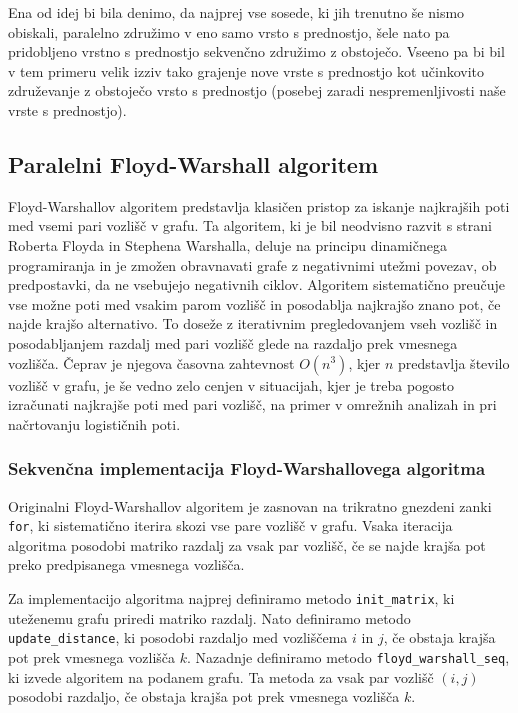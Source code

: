\documentclass[fin1, tisk]{fmfdelo}
\begin{document}
Ena od idej bi bila denimo, da najprej vse sosede, ki jih trenutno še nismo obiskali, paralelno združimo v eno samo vrsto s prednostjo, šele nato pa
pridobljeno vrstno s prednostjo sekvenčno združimo z obstoječo. 
Vseeno pa bi bil v tem primeru velik izziv tako grajenje nove vrste s prednostjo kot učinkovito združevanje
z obstoječo vrsto s prednostjo (posebej zaradi nespremenljivosti naše vrste s prednostjo).

\subsection{Paralelni Floyd-Warshall algoritem}

Floyd-Warshallov algoritem predstavlja klasičen pristop za iskanje najkrajših poti med vsemi pari vozlišč v grafu.
Ta algoritem, ki je bil neodvisno razvit s strani Roberta Floyda in Stephena Warshalla, deluje na principu dinamičnega
programiranja in je zmožen obravnavati grafe z negativnimi utežmi povezav, ob predpostavki, da ne vsebujejo negativnih ciklov.
Algoritem sistematično preučuje vse možne poti med vsakim parom vozlišč in posodablja najkrajšo znano pot, če najde krajšo alternativo.
To doseže z iterativnim pregledovanjem vseh vozlišč in posodabljanjem razdalj med pari vozlišč glede na razdaljo prek vmesnega vozlišča.
Čeprav je njegova časovna zahtevnost $O(n^3)$, kjer $n$ predstavlja število vozlišč v grafu, je še vedno zelo cenjen v situacijah, kjer
je treba pogosto izračunati najkrajše poti med pari vozlišč, na primer v omrežnih analizah in pri načrtovanju logističnih poti.

\subsubsection{Sekvenčna implementacija Floyd-Warshallovega algoritma}

Originalni Floyd-Warshallov algoritem je zasnovan na trikratno gnezdeni zanki \texttt{for}, ki sistematično iterira skozi vse pare vozlišč v grafu.
Vsaka iteracija algoritma posodobi matriko razdalj za vsak par vozlišč, če se najde krajša pot preko predpisanega vmesnega vozlišča.

Za implementacijo algoritma najprej definiramo metodo \texttt{init\_matrix}, ki uteženemu grafu priredi matriko razdalj.
Nato definiramo metodo \texttt{update\_distance}, ki posodobi razdaljo med vozliščema $i$ in $j$, če obstaja krajša pot prek vmesnega vozlišča $k$.
Nazadnje definiramo metodo \texttt{floyd\_warshall\_seq}, ki izvede algoritem na podanem grafu. Ta metoda za vsak par vozlišč $(i, j)$
posodobi razdaljo, če obstaja krajša pot prek vmesnega vozlišča $k$.
\end{document}
